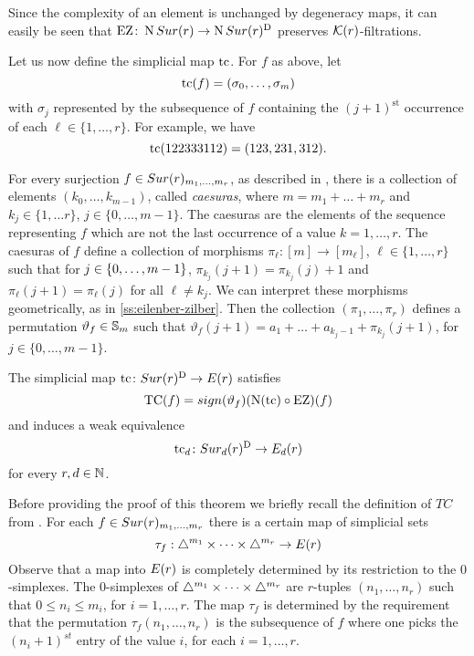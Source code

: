 Since the complexity of an element is unchanged by degeneracy maps, it can easily be seen that $\operatorname{EZ} \colon \operatorname{N}Sur(r) \to \operatorname{N}Sur(r)^{\mathrm{D}}$ preserves $\mathcal{K}(r)$-filtrations.

Let us now define the simplicial map $\operatorname{tc}$.
For $f$ as above, let
\[
\operatorname{tc}(f) = (\sigma_0,\dots,\sigma_m)
\]
with $\sigma_j$ represented by the subsequence of $f$ containing the $(j+1)^{\mathrm{st}}$ occurrence of each $\ell \in \{1,\dots,r\}$.
For example, we have
\[
\operatorname{tc}(122333112) = (123,231,312).
\]

For every surjection $f\in Sur(r)_{m_1,\dots,m_r}$, as described in \cite[\S1.2.2]{berger1997confspacemodel}, there is a collection of elements $(k_0,\dots,k_{m-1})$, called \textit{caesuras}, where $m=m_1+\dots + m_r$ and $k_j \in \{1,\dots r\}$, $j\in\{0,\dots, m-1\}$.
The caesuras are the elements of the sequence representing $f$ which are not the last occurrence of a value $k= 1,\dots, r$. The caesuras of
$f$ define a collection of morphisms $\pi_\ell \colon [m] \to [m_\ell]$, $\ell\in\{1,\dots,r\}$ such that for $j \in \{0,\dots,m-1\}$,  $\pi_{k_j}(j+1) = \pi_{k_j}(j)+1$ and $\pi_\ell(j+1) = \pi_\ell(j)$ for all $\ell \neq k_j$. We can interpret these morphisms geometrically, as in \cref{ss:eilenber-zilber}. Then the collection $(\pi_1, \dots, \pi_r)$ defines a permutation $\vartheta_f\in \mathbb{S}_m$ such that $\vartheta_f(j+1)=a_1 +\dots+ a_{k_j -1} + \pi_{k_j}(j+1)$, for $ j\in\{0,\dots, m-1\}$.

\begin{theorem}\label{thm:tc-decomposition}
	The simplicial map $\operatorname{tc} \colon Sur(r)^{\mathrm{D}} \to E(r)$ satisfies
	\[
	\operatorname{TC}(f) = sign(\vartheta_f)(\operatorname{N}(\operatorname{tc}) \circ \operatorname{EZ} )(f)
	\]
	and induces a weak equivalence
	\[
	\operatorname{tc}_d \colon Sur_d(r)^{\mathrm{D}} \to E_d(r)
	\]
	for every $r,d \in \mathbb{N}$.
\end{theorem}

Before providing the proof of this theorem we briefly recall the definition of $TC$ from \cite[]{berger2002prismatic}. For each $f\in Sur(r)_{m_1,\dots,m_r}$ there is a certain map of simplicial sets $$\tau_f:\triangle^{m_1}\times\dots\times\triangle^{m_r}\to E(r)$$ Observe that a map into $E(r)$ is completely determined by its restriction to the $0$-simplexes. The $0$-simplexes of $\triangle^{m_1}\times\dots\times\triangle^{m_r}$ are $r$-tuples
$(n_1,\dots,n_r)$ such that $0 \leq n_i \leq m_i$,
for $i=1,\dots,r$. The map $\tau_f$ is determined by
the requirement that the permutation $\tau_f(n_1,\dots,n_r)$ is the subsequence of $f$ where one picks the $(n_i+1)^{st}$ entry of the value $i$, for each $i=1,\dots,r$.

